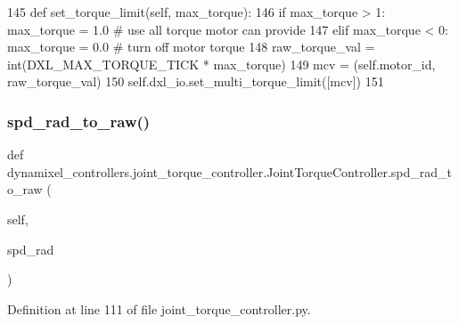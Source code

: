 \begin{DoxyCode}
145     \textcolor{keyword}{def }set\_torque\_limit(self, max\_torque):
146         \textcolor{keywordflow}{if} max\_torque > 1: max\_torque = 1.0         \textcolor{comment}{# use all torque motor can provide}
147         \textcolor{keywordflow}{elif} max\_torque < 0: max\_torque = 0.0       \textcolor{comment}{# turn off motor torque}
148         raw\_torque\_val = int(DXL\_MAX\_TORQUE\_TICK * max\_torque)
149         mcv = (self.motor\_id, raw\_torque\_val)
150         self.dxl\_io.set\_multi\_torque\_limit([mcv])
151 
\end{DoxyCode}
\mbox{\label{classdynamixel__controllers_1_1joint__torque__controller_1_1_joint_torque_controller_ac5eb1af408da423a97956bc896859db4}} 
\subsubsection{\texorpdfstring{spd\+\_\+rad\+\_\+to\+\_\+raw()}{spd\_rad\_to\_raw()}}
{\footnotesize\ttfamily def dynamixel\+\_\+controllers.\+joint\+\_\+torque\+\_\+controller.\+Joint\+Torque\+Controller.\+spd\+\_\+rad\+\_\+to\+\_\+raw (\begin{DoxyParamCaption}\item[{}]{self,  }\item[{}]{spd\+\_\+rad }\end{DoxyParamCaption})}



Definition at line 111 of file joint\+\_\+torque\+\_\+controller.\+py.



